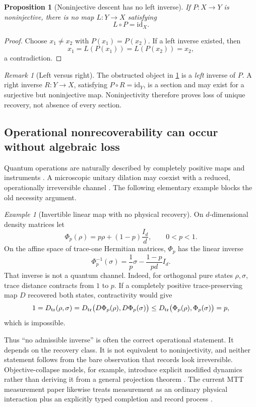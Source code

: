 \documentclass[11pt]{article}
\newtheorem{proposition}[theorem]{Proposition}
\theoremstyle{definition}
\theoremstyle{remark}
\newtheorem{remark}[theorem]{Remark}
\newtheorem{example}[theorem]{Example}
\newcommand{\id}{\mathrm{id}}
\begin{document}
\begin{proposition}[Noninjective descent has no left inverse]
\label{prop:no-left-inverse}
If \(P:X\to Y\) is noninjective, there is no map \(L:Y\to X\) satisfying
\[
 L\circ P=\id_X.
\]
\end{proposition}

\begin{proof}
Choose \(x_1\neq x_2\) with \(P(x_1)=P(x_2)\). If a left inverse existed, then
\[
 x_1=L(P(x_1))=L(P(x_2))=x_2,
\]
a contradiction.
\end{proof}

\begin{remark}[Left versus right]
The obstructed object in \cref{prop:no-left-inverse} is a \emph{left} inverse
of \(P\). A right inverse \(R:Y\to X\), satisfying \(P\circ R=\id_Y\), is a
section and may exist for a surjective but noninjective map. Noninjectivity
therefore proves loss of unique recovery, not absence of every section.
\end{remark}

\subsection{Operational nonrecoverability can occur without algebraic loss}

Quantum operations are naturally described by completely positive maps and
instruments \cite{DaviesLewis1970}. A microscopic unitary dilation may coexist
with a reduced, operationally irreversible channel
\cite{Stinespring1955}. The following elementary example blocks the old
necessity argument.

\begin{example}[Invertible linear map with no physical recovery]
\label{ex:depolarizing}
On \(d\)-dimensional density matrices let
\[
 \Phi_p(\rho)=p\rho+(1-p)\frac{I_d}{d},
 \qquad 0<p<1.
\]
On the affine space of trace-one Hermitian matrices, \(\Phi_p\) has the linear
inverse
\[
 \Phi_p^{-1}(\sigma)
 =\frac{1}{p}\sigma-\frac{1-p}{pd}I_d.
\]
That inverse is not a quantum channel. Indeed, for orthogonal pure states
\(\rho,\sigma\), trace distance contracts from \(1\) to \(p\). If a completely
positive trace-preserving map \(D\) recovered both states, contractivity would
give
\[
 1=D_{\rm tr}(\rho,\sigma)
 =D_{\rm tr}\bigl(D\Phi_p(\rho),D\Phi_p(\sigma)\bigr)
 \leq D_{\rm tr}\bigl(\Phi_p(\rho),\Phi_p(\sigma)\bigr)
 =p,
\]
which is impossible.
\end{example}

Thus ``no admissible inverse'' is often the correct operational statement.
It depends on the recovery class. It is not equivalent to noninjectivity, and
neither statement follows from the bare observation that records look
irreversible. Objective-collapse models, for example, introduce explicit
modified dynamics rather than deriving it from a general projection theorem
\cite{GRW1986}. The current MTT measurement paper likewise treats measurement
as an ordinary physical interaction plus an explicitly typed completion and
record process \cite{NeroMeasurement2026}.
\end{document}

